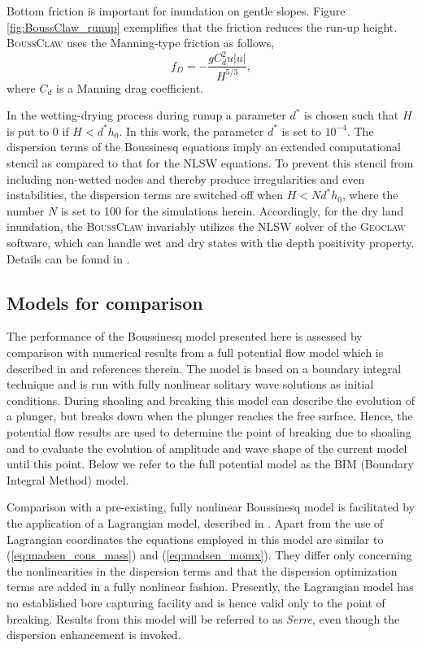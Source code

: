 \documentclass[review]{elsarticle}
\newcommand{\BoussClaw}{\textsc{BoussClaw} }
\begin{document}
Bottom friction is important for inundation on gentle slopes. 
Figure \ref{fig:BoussClaw_runup} 
exemplifies that the friction reduces the run-up height.
\BoussClaw uses the Manning-type friction as follows,
\begin{equation}
\label{eq:Manning}
f_D = -\frac{g C_d^2 u |u|}{H^{5/3}},
\end{equation}
where $C_d$ is a Manning drag coefficient.

In the wetting-drying process during runup a parameter $d^*$ is chosen
such that $H$ is put to $0$ if $H<d^*h_0$.
In this work, the parameter $d^*$ is set to $10^{-4}$. 
The dispersion terms of the Boussinesq equations imply an extended computational
stencil as compared to that for the NLSW equations. To prevent this stencil 
from including non-wetted nodes and thereby produce irregularities and even instabilities, the dispersion terms are switched off when $H<Nd^*h_0$, where the number $N$ is set to 100 for the simulations herein.
Accordingly, for the dry land inundation, the \BoussClaw invariably
utilizes the NLSW solver of the \textsc{Geoclaw} software,
which can handle 
wet and dry states with the depth positivity property.
Details can be found in \cite{george2008augmented}. 

\subsection{Models for comparison}
The performance of the Boussinesq model presented here is 
assessed by comparison with numerical results from a full potential
flow model which is described in \citet{Lovholt:2013a} and references therein. The model is based on a boundary 
integral technique and is run  with fully nonlinear solitary
wave solutions as initial conditions. During shoaling and breaking this
model can describe the evolution of a plunger, but breaks down
when the plunger reaches the free surface. Hence, the potential flow 
results are used to determine the point of breaking due to shoaling 
and to
evaluate the evolution of  amplitude and wave 
shape of the current model until this point.   
Below we refer to the full potential model as the BIM (Boundary
 Integral Method) model.

Comparison with a pre-existing, fully nonlinear Boussinesq model is
facilitated by the application of a Lagrangian model, described
in \citet{Lovholt:2013a}. Apart from the use of
Lagrangian coordinates the equations employed in this model are
 similar to (\ref{eq:madsen_cons_mass}) and (\ref{eq:madsen_momx}).
They differ only concerning the nonlinearities in the
dispersion terms and that  the dispersion optimization terms are added in a fully nonlinear fashion.
Presently, the Lagrangian model has no established bore capturing 
facility and is hence valid only to the point of breaking.
Results from this model will be referred to as {\em Serre}, even though
the dispersion enhancement is invoked. 
 
\end{document}
